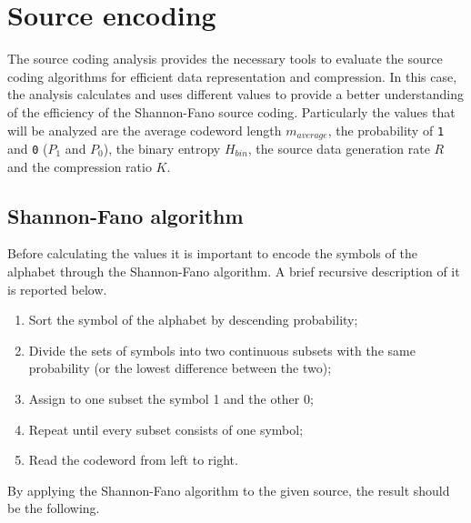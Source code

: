 \section{Source encoding}
The source coding analysis provides the necessary tools to evaluate the source coding algorithms for efficient data representation and compression. In this case, the analysis calculates and uses different values to provide a better understanding of the efficiency of the Shannon-Fano source coding. Particularly the values that will be analyzed are the average codeword length $m_{average}$, the probability of \texttt{1} and \texttt{0} ($P_1$ and $P_0$), the binary entropy $H_{bin}$, the source data generation rate $R$ and the compression ratio $K$.


\subsection{Shannon-Fano algorithm}
Before calculating the values it is important to encode the symbols of the alphabet through the Shannon-Fano algorithm. A brief recursive description of it is reported below.
\begin{enumerate}
    \item Sort the symbol of the alphabet by descending probability;
    \item Divide the sets of symbols into two continuous subsets with the same probability (or the lowest difference between the two);
    \item Assign to one subset the symbol 1 and the other 0;
    \item Repeat until every subset consists of one symbol;
    \item Read the codeword from left to right.
\end{enumerate} 

\noindent By applying the Shannon-Fano algorithm to the given source, the result should be the following.

